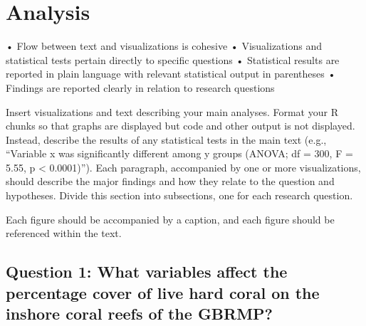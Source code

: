 \documentclass[12pt,]{article}
\begin{document}
\newpage

\hypertarget{analysis}{%
\section{Analysis}\label{analysis}}

• Flow between text and visualizations is cohesive • Visualizations and
statistical tests pertain directly to specific questions • Statistical
results are reported in plain language with relevant statistical output
in parentheses • Findings are reported clearly in relation to research
questions

Insert visualizations and text describing your main analyses. Format
your R chunks so that graphs are displayed but code and other output is
not displayed. Instead, describe the results of any statistical tests in
the main text (e.g., ``Variable x was significantly different among y
groups (ANOVA; df = 300, F = 5.55, p \textless{} 0.0001)''). Each
paragraph, accompanied by one or more visualizations, should describe
the major findings and how they relate to the question and hypotheses.
Divide this section into subsections, one for each research question.

Each figure should be accompanied by a caption, and each figure should
be referenced within the text.

\hypertarget{question-1-what-variables-affect-the-percentage-cover-of-live-hard-coral-on-the-inshore-coral-reefs-of-the-gbrmp}{%
\subsection{Question 1: What variables affect the percentage cover of
live hard coral on the inshore coral reefs of the
GBRMP?}\label{question-1-what-variables-affect-the-percentage-cover-of-live-hard-coral-on-the-inshore-coral-reefs-of-the-gbrmp}}
\end{document}
